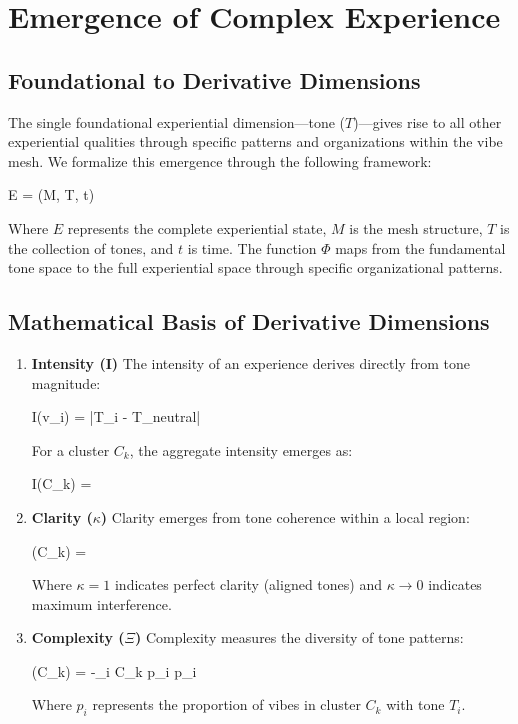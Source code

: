 \documentclass{article}
\let\oldequation\equation
\let\endoldequation\endequation
\renewenvironment{equation}{%
    \noindent\vspace{-\parskip}\vspace{-\baselineskip}%
    \oldequation
}{%
    \endoldequation
    \noindent\vspace{-\parskip}\vspace{-\baselineskip}%
}
\theoremstyle{definition}
\theoremstyle{axiom}
\theoremstyle{theorem}
\theoremstyle{lemma}
\theoremstyle{proposition}
\begin{document}
\section{Emergence of Complex Experience}

\subsection{Foundational to Derivative Dimensions}

The single foundational experiential dimension---tone ($T$)---gives rise to all other experiential qualities through specific patterns and organizations within the vibe mesh. We formalize this emergence through the following framework:

\begin{equation}
E = \Phi(M, T, t)
\end{equation}

Where $E$ represents the complete experiential state, $M$ is the mesh structure, $T$ is the collection of tones, and $t$ is time. The function $\Phi$ maps from the fundamental tone space to the full experiential space through specific organizational patterns.

\subsection{Mathematical Basis of Derivative Dimensions}

\begin{enumerate}
\item \textbf{Intensity (I)} The intensity of an experience derives directly from tone magnitude:

\begin{equation}
I(v_i) = |T_i - T_{neutral}|
\end{equation}

For a cluster $C_k$, the aggregate intensity emerges as:

\begin{equation}
I(C_k) = 
\end{equation}

\item \textbf{Clarity ($\kappa$)} Clarity emerges from tone coherence within a local region:

\begin{equation}
\kappa(C_k) = 
\end{equation}

Where $\kappa = 1$ indicates perfect clarity (aligned tones) and $\kappa \to 0$ indicates maximum interference.

\item \textbf{Complexity ($\Xi$)} Complexity measures the diversity of tone patterns:

\begin{equation}
\Xi(C_k) = -\sum_{i \in C_k} p_i \log p_i
\end{equation}

Where $p_i$ represents the proportion of vibes in cluster $C_k$ with tone $T_i$.
\end{enumerate}
\end{document}

